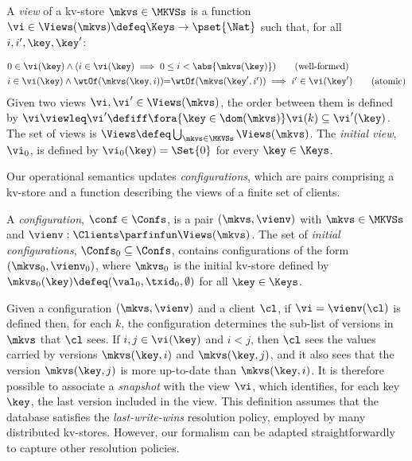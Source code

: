 \begin{definition}[Views]
\label{def:view}
\label{def:cuts}
\label{def:views}
A \emph{view} of a kv-store $\mkvs \in \MKVSs$ is a function
$\vi \in \Views(\mkvs) \defeq \Keys \to\pset{\Nat}$ such that, for all $i, i', \key, \key'$:

\vspace{-5pt}
{%
\displaymathfont
\begin{align*}
    & 
    0 \in \vi(\key) 
    \land (i \in \vi(\key) \implies 0 \leq i < \abs{ \mkvs(\key) }) 
    \tag{well-formed}
    \label{eq:view.wf}\\
    & 
    \begin{array}{@{}l@{}}
	i \in \vi(\key)  
  	\land \wtOf(\mkvs(\key, i)) {=} \wtOf(\mkvs(\key', i'))  
  	\implies i' \in \vi(\key')
    \end{array}
	\tag{atomic}
	\label{eq:view.atomic}
\end{align*}
}%
Given two views $\vi, \vi' \in \Views(\mkvs)$, 
the order between them is defined by $\vi \viewleq \vi' \defiff \fora{\key \in \dom(\mkvs)} \vi(k) \subseteq \vi'(\key)$.
The set of views is $\Views \defeq \bigcup_{\mkvs \in \MKVSs} \Views(\mkvs)$.
%
\noindent The \emph{initial view}, $\vi_{0}$,  is defined by
$\vi_{0}(\key) = \Set{0}$ for every $\key \in \Keys$. 
\end{definition}

Our operational semantics updates {\em configurations},  which are pairs
comprising a kv-store and a function describing the
views of a finite set of clients. 

\begin{definition}[Configurations]
\label{def:configuration}
A \emph{configuration}, $\conf \in \Confs $,  is a pair $ (\mkvs, \vienv)$
with $\mkvs \in \MKVSs$ and
$\vienv : \Clients \parfinfun \Views(\mkvs)$. 
The set of \emph{initial configurations}, $\Confs_0 \subseteq \Confs$,
contains configurations of the form $ (\mkvs_0, \vienv_0)$, where
$\mkvs_0$ is the initial kv-store defined by
$\mkvs_{0}(\key)\defeq  (\val_0, \txid_0, \emptyset)$ for
all $\key \in \Keys$. 
\end{definition}


Given a configuration $(\mkvs, \vienv)$ and a client $\cl$, 
if $\vi = \vienv(\cl)$ is defined then, for each $k$,  the
configuration determines the sub-list of versions in $\mkvs$ that $\cl$ sees.
If $i,j \in \vi(\key)$ and $i < j$, then $\cl$ sees the values 
carried by versions $\mkvs(\key, i)$ and  $\mkvs(\key, j)$, 
and it also sees that the version $\mkvs(\key, j)$ is more up-to-date than $\mkvs(\key, i)$. 
It is therefore possible to associate a \emph{snapshot} with the view $\vi$, 
which identifies, for each key $\key$, the last version included in the view. 
This definition assumes that the database satisfies the \emph{last-write-wins}
resolution policy, employed by many distributed kv-stores.
However, our formalism can be adapted straightforwardly  to capture other resolution policies. 

